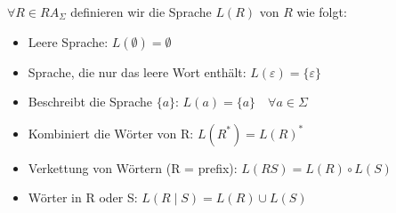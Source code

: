 \begin{concept}
    {$\forall  R \in R A_{\Sigma}$} definieren wir die Sprache $L(R)$ von $R$ wie folgt:
    \begin{itemize}
        \item Leere Sprache: $L(\emptyset)=\emptyset$
        \item Sprache, die nur das leere Wort enthält: $L(\varepsilon)=\{\varepsilon\}$
        \item Beschreibt die Sprache $\{a\}$: $L(a)=\{a\} \quad \forall a \in \Sigma$
        \item Kombiniert die Wörter von R: $L(R^{*})=L(R)^{*}$
        \item Verkettung von Wörtern (R = prefix): $L(R S)=L(R) \circ L(S)$
        \item Wörter in R oder S: $L(R \mid S)=L(R) \cup L(S)$
    \end{itemize}
\end{concept}









